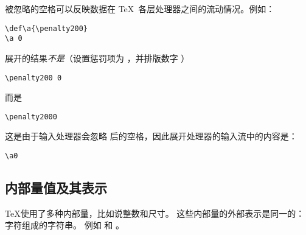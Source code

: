 \documentclass{book}
\begin{document}
被忽略的空格可以反映数据在 \TeX\ 各层处理器之间的流动情况。例如：
\begin{verbatim}
\def\a{\penalty200}
\a 0
\end{verbatim}
展开的结果\emph{不是}（设置惩罚项为 ，并排版数字 ）
\begin{verbatim}
\penalty200 0
\end{verbatim}
而是
\begin{verbatim}
\penalty2000
\end{verbatim}
这是由于输入处理器会忽略  后的空格，因此展开处理器的输入流中的内容是：
\begin{verbatim}
\a0
\end{verbatim}

\subsection{内部量值及其表示}

\TeX 使用了多种内部量，比如说整数和尺寸。
这些内部量的外部表示是同一的：字符组成的字符串。
例如  和 \n{91.44cm}。
\end{document}
